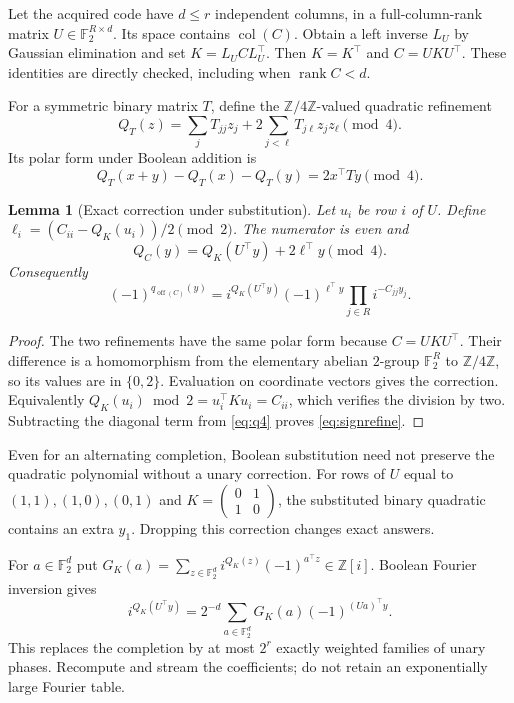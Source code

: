 \documentclass[11pt,a4paper]{article}
\newtheorem{lemma}[theorem]{Lemma}
\theoremstyle{remark}\newtheorem{remark}[theorem]{Remark}
\newcommand{\F}{\mathbb F}\newcommand{\Z}{\mathbb Z}\newcommand{\Q}{\mathbb Q}
\newcommand{\rank}{\operatorname{rank}}\newcommand{\diag}{\operatorname{diag}}
\newcommand{\off}{\operatorname{off}}\newcommand{\col}{\operatorname{col}}
\begin{document}
Let the acquired code have $d\le r$ independent columns, in a
full-column-rank matrix $U\in\F_2^{R\times d}$. Its space
contains $\col(C)$. Obtain a left inverse $L_U$ by Gaussian
elimination and set $K=L_U C L_U^\top$. Then $K=K^\top$ and
$C=UKU^\top$. These identities are directly checked,
including when $\rank C<d$.

For a symmetric binary matrix $T$, define the $\Z/4\Z$-valued
quadratic refinement
\begin{equation}\label{eq:q4}
Q_T(z)=\sum_jT_{jj}z_j+2\sum_{j<\ell}T_{j\ell}z_jz_\ell\pmod4.
\end{equation}
Its polar form under Boolean addition is
\[
Q_T(x+y)-Q_T(x)-Q_T(y)=2x^\top T y\pmod4.
\]
\begin{lemma}[Exact correction under substitution]\label{lem:refine}
Let $u_i$ be row $i$ of $U$. Define
$\ell_i=(C_{ii}-Q_K(u_i))/2\pmod2$. The numerator is even and
\[
Q_C(y)=Q_K(U^\top y)+2\ell^\top y\pmod4.
\]
Consequently
\begin{equation}\label{eq:signrefine}
(-1)^{q_{\off(C)}(y)}
=i^{Q_K(U^\top y)}
 (-1)^{\ell^\top y}\prod_{j\in R}i^{-C_{jj}y_j}.
\end{equation}
\end{lemma}
\begin{proof}
The two refinements have the same polar form because $C=UKU^\top$.
Their difference is a homomorphism from the elementary abelian
$2$-group $\F_2^R$ to $\Z/4\Z$, so its values are in $\{0,2\}$.
Evaluation on coordinate vectors gives the correction.
Equivalently $Q_K(u_i)\bmod2=u_i^\top K u_i=C_{ii}$, which
verifies the division by two. Subtracting the diagonal term
from \eqref{eq:q4} proves \eqref{eq:signrefine}.
\end{proof}

Even for an alternating completion, Boolean substitution need
not preserve the quadratic polynomial without a unary correction.
For rows of $U$ equal to $(1,1),(1,0),(0,1)$ and
$K=\left(\begin{smallmatrix}0&1\\1&0\end{smallmatrix}\right)$,
the substituted binary quadratic contains an extra $y_1$.
Dropping this correction changes exact answers.

For $a\in\F_2^d$ put
$G_K(a)=\sum_{z\in\F_2^d}i^{Q_K(z)}(-1)^{a^\top z}\in\Z[i]$.
Boolean Fourier inversion gives
\begin{equation}\label{eq:fourier}
i^{Q_K(U^\top y)}
=2^{-d}\sum_{a\in\F_2^d}G_K(a)(-1)^{(Ua)^\top y}.
\end{equation}
This replaces the completion by at most $2^r$ exactly weighted
families of unary phases. Recompute and stream the coefficients;
do not retain an exponentially large Fourier table.
\end{document}
